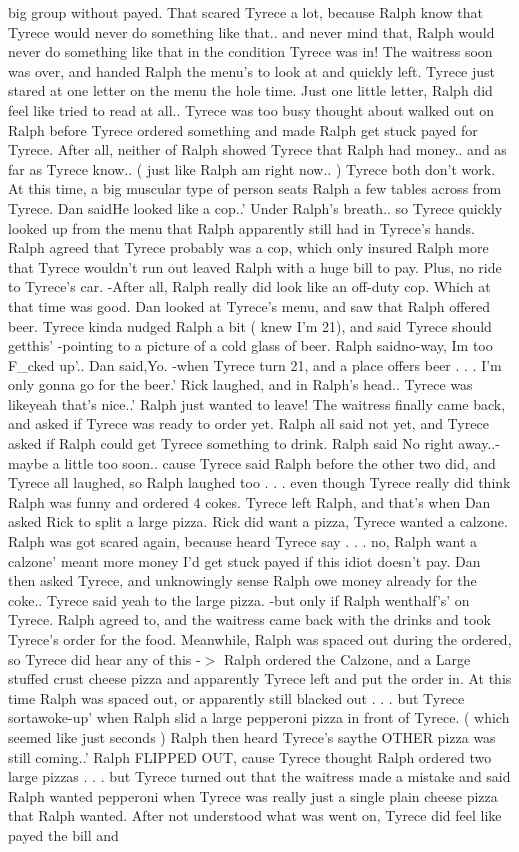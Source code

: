 \documentclass[12pt]{book}
\begin{document}
big group without payed. That scared Tyrece a lot, because Ralph know that Tyrece would never do something like that.. and never mind that, Ralph would never do something like that in the condition Tyrece was in! The waitress soon was over, and handed Ralph the menu's to look at and quickly left. Tyrece just stared at one letter on the menu the hole time. Just one little letter, Ralph did feel like tried to read at all.. Tyrece was too busy thought about walked out on Ralph before Tyrece ordered something and made Ralph get stuck payed for Tyrece. After all, neither of Ralph showed Tyrece that Ralph had money.. and as far as Tyrece know.. ( just like Ralph am right now.. ) Tyrece both don't work. At this time, a big muscular type of person seats Ralph a few tables across from Tyrece. Dan saidHe looked like a cop..' Under Ralph's breath.. so Tyrece quickly looked up from the menu that Ralph apparently still had in Tyrece's hands. Ralph agreed that Tyrece probably was a cop, which only insured Ralph more that Tyrece wouldn't run out leaved Ralph with a huge bill to pay. Plus, no ride to Tyrece's car. -After all, Ralph really did look like an off-duty cop. Which at that time was good. Dan looked at Tyrece's menu, and saw that Ralph offered beer. Tyrece kinda nudged Ralph a bit ( knew I'm 21), and said Tyrece should getthis' -pointing to a picture of a cold glass of beer. Ralph saidno-way, Im too F\_cked up'.. Dan said,Yo. -when Tyrece turn 21, and a place offers beer . . .  I'm only gonna go for the beer.' Rick laughed, and in Ralph's head.. Tyrece was likeyeah that's nice..' Ralph just wanted to leave! The waitress finally came back, and asked if Tyrece was ready to order yet. Ralph all said not yet, and Tyrece asked if Ralph could get Tyrece something to drink. Ralph said No right away..-maybe a little too soon.. cause Tyrece said Ralph before the other two did, and Tyrece all laughed, so Ralph laughed too . . .  even though Tyrece really did think Ralph was funny and ordered 4 cokes. Tyrece left Ralph, and that's when Dan asked Rick to split a large pizza. Rick did want a pizza, Tyrece wanted a calzone. Ralph was got scared again, because heard Tyrece say . . .  no, Ralph want a calzone' meant more money I'd get stuck payed if this idiot doesn't pay. Dan then asked Tyrece, and unknowingly sense Ralph owe money already for the coke.. Tyrece said yeah to the large pizza. -but only if Ralph wenthalf's' on Tyrece. Ralph agreed to, and the waitress came back with the drinks and took Tyrece's order for the food. Meanwhile, Ralph was spaced out during the ordered, so Tyrece did hear any of this -$>$ Ralph ordered the Calzone, and a Large stuffed crust cheese pizza and apparently Tyrece left and put the order in. At this time Ralph was spaced out, or apparently still blacked out  . . .  but Tyrece sortawoke-up' when Ralph slid a large pepperoni pizza in front of Tyrece. ( which seemed like just seconds ) Ralph then heard Tyrece's saythe OTHER pizza was still coming..' Ralph FLIPPED OUT, cause Tyrece thought Ralph ordered two large pizzas  . . .  but Tyrece turned out that the waitress made a mistake and said Ralph wanted pepperoni when Tyrece was really just a single plain cheese pizza that Ralph wanted. After not understood what was went on, Tyrece did feel like payed the bill and 
\end{document}
